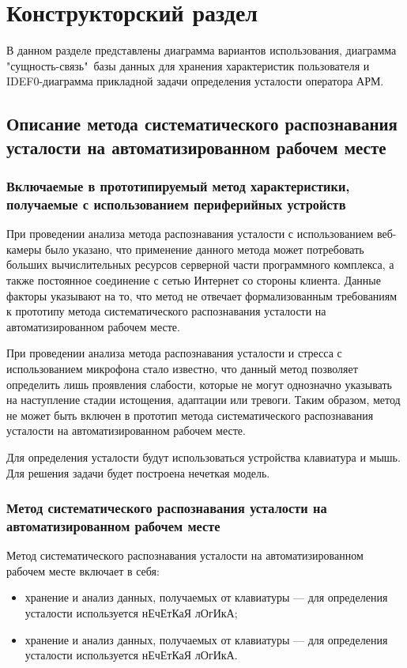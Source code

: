 \section{Конструкторский раздел}
В данном разделе представлены диаграмма вариантов использования, диаграмма "сущность-связь"\ базы данных для хранения характеристик пользователя и IDEF0-диаграмма прикладной задачи определения усталости оператора АРМ.

\subsection{Описание метода систематического распознавания усталости на автоматизированном рабочем месте}

\subsubsection{Включаемые в прототипируемый метод характеристики, получаемые с использованием периферийных устройств}

При проведении анализа метода распознавания усталости с использованием веб-камеры было указано, что применение данного метода может потребовать больших вычислительных ресурсов серверной части программного комплекса, а также постоянное соединение с сетью Интернет со стороны клиента. Данные факторы указывают на то, что метод не отвечает формализованным требованиям к прототипу метода систематического распознавания усталости на автоматизированном рабочем месте.

При проведении анализа метода распознавания усталости и стресса с использованием микрофона стало известно, что данный метод позволяет определить лишь проявления слабости, которые не могут однозначно указывать на наступление стадии истощения, адаптации или тревоги. Таким образом, метод не может быть включен в прототип метода систематического распознавания усталости на автоматизированном рабочем месте.

Для определения усталости будут использоваться устройства клавиатура и мышь. Для решения задачи будет построена нечеткая модель.

\subsubsection{Метод систематического распознавания усталости на автоматизированном рабочем месте}
Метод систематического распознавания усталости на автоматизированном рабочем месте включает в себя:
\begin{itemize}[leftmargin=1.6\parindent]
\item хранение и анализ данных, получаемых от клавиатуры --- для определения усталости используется нЕчЕтКаЯ лОгИкА;
\item хранение и анализ данных, получаемых от клавиатуры --- для определения усталости используется нЕчЕтКаЯ лОгИкА.
\end{itemize}


